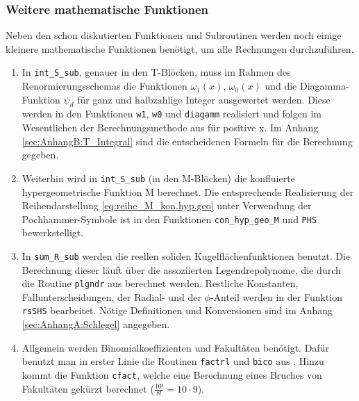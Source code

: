 \subsubsection{Weitere mathematische Funktionen}
%
Neben den schon diskutierten Funktionen und Subroutinen werden noch einige 
kleinere mathematische Funktionen benötigt, um alle Rechnungen durchzuführen.  
\begin{enumerate}
	\item In \texttt{int\_S\_sub}, genauer in den T-Blöcken, muss im Rahmen des 
	Renormierungsschemas die Funktionen $\omega_1(x)$, $\omega_0(x)$ und die 
	Diagamma-Funktion $\psi_d$ für ganz und halbzahlige Integer ausgewertet 
	werden. Diese werden in den Funktionen  \texttt{w1}, \texttt{w0} und 
	\texttt{diagamm} realisiert und folgen im Wesentlichen der 
	Berechnungsmethode aus \cite{av:1a2} für positive x. Im Anhang 
	\ref{sec:AnhangB:T_Integral} sind die entscheidenen Formeln für die 
	Berechnung gegeben.
	\item Weiterhin wird in \texttt{int\_S\_sub} (in den M-Blöcken) die 
	konfluierte hypergeometrische Funktion M berechnet. Die entsprechende 
	Realisierung der Reihendarstellung \ref{eq:reihe_M_kon.hyp.geo} unter 
	Verwendung der Pochhammer-Symbole ist in den Funktionen 
	\texttt{con\_hyp\_geo\_M} und \texttt{PHS} bewerkstelligt.
	\item In \texttt{sum\_R\_sub} werden die reellen soliden 
	Kugelflächenfunktionen benutzt. Die Berechnung dieser läuft über die 
	assoziierten Legendrepolynome, die durch die Routine \texttt{plgndr} aus 
	\cite{b:4a} berechnet werden. Restliche Konstanten, Fallunterscheidungen, 
	der Radial- und der $\phi$-Anteil werden in der Funktion \texttt{rsSHS} 
	bearbeitet. Nötige Definitionen und Konversionen sind im Anhang 
	\ref{sec:AnhangA:Schlegel} angegeben. 
    \item Allgemein werden Binomialkoeffizienten und Fakultäten benötigt. Dafür 
    benutzt man in erster Linie die Routinen \texttt{factrl} und \texttt{bico} 
    aus 
    \cite{b:4a}. Hinzu kommt die Funktion \texttt{cfact}, welche eine 
    Berechnung  eines Bruches von Fakultäten gekürzt berechnet 
    ($\frac{10!}{8!}=10\cdot 9$).
\end{enumerate}
%
%
%
